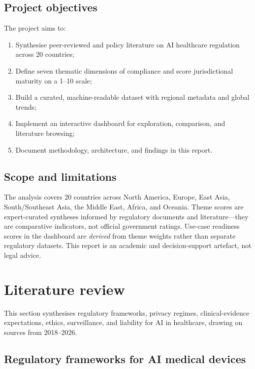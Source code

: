 \documentclass[12pt,a4paper]{report}
\begin{document}
\subsection{Project objectives}

The project aims to:
\begin{enumerate}
  \item Synthesise peer-reviewed and policy literature on AI healthcare regulation across 20 countries;
  \item Define seven thematic dimensions of compliance and score jurisdictional maturity on a 1--10 scale;
  \item Build a curated, machine-readable dataset with regional metadata and global trends;
  \item Implement an interactive dashboard for exploration, comparison, and literature browsing;
  \item Document methodology, architecture, and findings in this report.
\end{enumerate}

\subsection{Scope and limitations}

The analysis covers 20 countries across North America, Europe, East Asia, South/Southeast Asia, the Middle East, Africa, and Oceania. Theme scores are expert-curated syntheses informed by regulatory documents and literature---they are comparative indicators, not official government ratings. Use-case readiness scores in the dashboard are \emph{derived} from theme weights rather than separate regulatory datasets. This report is an academic and decision-support artefact, not legal advice.

\section{Literature review}
\label{sec:lit}

This section synthesises regulatory frameworks, privacy regimes, clinical-evidence expectations, ethics, surveillance, and liability for AI in healthcare, drawing on sources from 2018--2026.

\subsection{Regulatory frameworks for AI medical devices}
\end{document}
